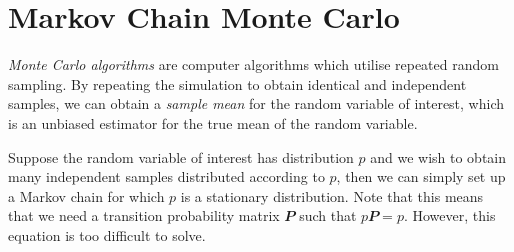 \documentclass[math, code]{amznotes}
\theoremstyle{remark}
\begin{document}
\section{Markov Chain Monte Carlo}
\textit{Monte Carlo algorithms} are computer algorithms which utilise repeated random sampling. By repeating the simulation to obtain identical and independent samples, we can obtain a \textit{sample mean} for the random variable of interest, which is an unbiased estimator for the true mean of the random variable.

Suppose the random variable of interest has distribution $p$ and we wish to obtain many independent samples distributed according to $p$, then we can simply set up a Markov chain for which $p$ is a stationary distribution. Note that this means that we need a transition probability matrix $\mathbfit{P}$ such that $p\mathbfit{P} = p$. However, this equation is too difficult to solve.
\end{document}
